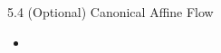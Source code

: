 \begin{frame}{5.4 (Optional) Canonical Affine Flow}
    \begin{itemize}
        \item
    \end{itemize}
\end{frame}
